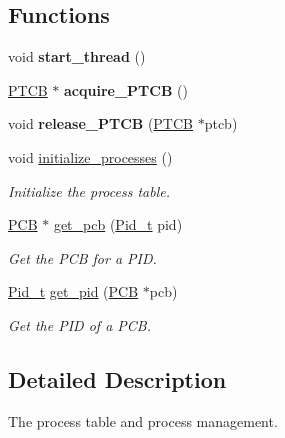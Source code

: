 \subsection*{Functions}
\begin{DoxyCompactItemize}
\item 
\mbox{\label{group__proc_ga52db4cfd0e6fd09eadac81a495def155}} 
void {\bfseries start\+\_\+thread} ()
\item 
\mbox{\label{group__proc_gac9caf1c940ba406c5647ebdc5ff8324f}} 
\hyperlink{group__scheduler_ga2115e4c199a702aaf36f4571877bf013}{P\+T\+CB} $\ast$ {\bfseries acquire\+\_\+\+P\+T\+CB} ()
\item 
\mbox{\label{group__proc_gaca1226d014784c6a35b1c86085231ecf}} 
void {\bfseries release\+\_\+\+P\+T\+CB} (\hyperlink{group__scheduler_ga2115e4c199a702aaf36f4571877bf013}{P\+T\+CB} $\ast$ptcb)
\item 
void \hyperlink{group__proc_ga82948cbeb57bb0b6e15d1f14f06a2db3}{initialize\+\_\+processes} ()
\begin{DoxyCompactList}\small\item\em Initialize the process table. \end{DoxyCompactList}\item 
\hyperlink{group__proc_gadf327f09ee935cf1734c14e8849f0421}{P\+CB} $\ast$ \hyperlink{group__proc_ga10cf45ea8bc92b00bd1f25553b9cf5c8}{get\+\_\+pcb} (\hyperlink{group__syscalls_gafac07f3170763932fac97b6eab2c3984}{Pid\+\_\+t} pid)
\begin{DoxyCompactList}\small\item\em Get the P\+CB for a P\+ID. \end{DoxyCompactList}\item 
\hyperlink{group__syscalls_gafac07f3170763932fac97b6eab2c3984}{Pid\+\_\+t} \hyperlink{group__proc_ga110e884cb053244b18d1058751a78cfe}{get\+\_\+pid} (\hyperlink{group__proc_gadf327f09ee935cf1734c14e8849f0421}{P\+CB} $\ast$pcb)
\begin{DoxyCompactList}\small\item\em Get the P\+ID of a P\+CB. \end{DoxyCompactList}\end{DoxyCompactItemize}


\subsection{Detailed Description}
The process table and process management. 

